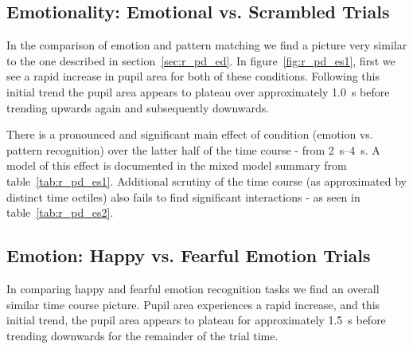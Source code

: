 	\subsection{Emotionality: Emotional vs. Scrambled Trials}\label{sec:r_pd_es}
	    In the comparison of emotion and pattern matching we find a picture very similar to the one described in section~\ref{sec:r_pd_ed}.
	    In figure~\ref{fig:r_pd_es1}, first we see a rapid increase in pupil area for both of these conditions.
	    Following this initial trend the pupil area appears to plateau over approximately \SI{1.0}{\second} before trending upwards again and subsequently downwards.
	    
	    
	    
	    There is a pronounced and significant main effect of condition (emotion vs. pattern recognition) over the latter half of the time course - from \SIrange{2}{4}{\second}.
	    A model of this effect is documented in the mixed model summary from table~\ref{tab:r_pd_es1}.
	    Additional scrutiny of the time course (as approximated by distinct time octiles) also fails to find significant interactions - as seen in table~\ref{tab:r_pd_es2}.
	\subsection{Emotion: Happy vs. Fearful Emotion Trials}\label{sec:r_pd_hf}
	    
	    In comparing happy and fearful emotion recognition tasks we find an overall similar time course picture.
	    Pupil area experiences a rapid increase,
	    and this initial trend, the pupil area appears to plateau for approximately \SI{1.5}{\second} before trending downwards for the remainder of the trial time.
	    
